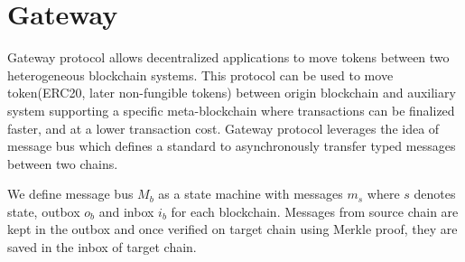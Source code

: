 \documentclass[12pt,a4paper]{article}
\begin{document}

\newpage
\section{Gateway}\label{gateway}

Gateway protocol allows decentralized applications to move tokens between two heterogeneous blockchain systems. 
This protocol can be used to move token(ERC20, later non-fungible tokens) between origin blockchain and auxiliary system supporting a specific meta-blockchain where transactions can be finalized faster, and at a lower transaction cost. 
Gateway protocol leverages the idea of message bus which defines a standard to asynchronously transfer typed messages between two chains.
 
We define message bus $M_b$ as a state machine with messages $m_s$ where $s$ denotes state, outbox $o_b$ and inbox $i_b$ for each blockchain. Messages from source chain are kept in the outbox
 and once verified on target chain using Merkle proof, they are saved in the inbox of target chain. 
 
\end{document}

